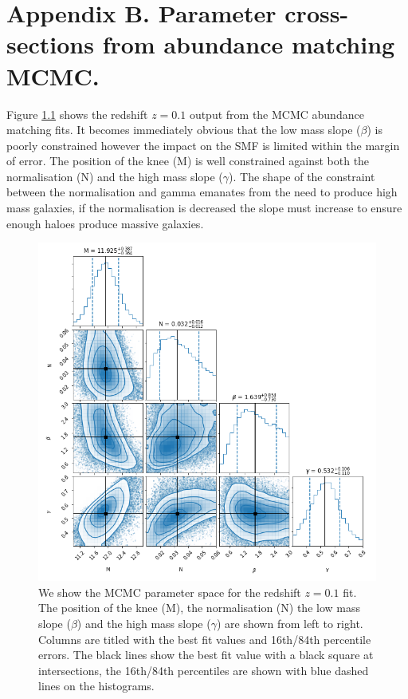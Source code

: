 \chapter{Appendix B. Parameter cross-sections from abundance matching MCMC.}

\label{Appx:AbnMCMC}

Figure \ref{fig:MCMC_lz} shows the redshift $z = 0.1$ output from the MCMC abundance matching fits. It becomes immediately obvious that the low mass slope ($\beta$) is poorly constrained however the impact on the SMF is limited within the margin of error. The position of the knee (M) is well constrained against both the normalisation (N) and the high mass slope ($\gamma$). The shape of the constraint between the normalisation and gamma emanates from the need to produce high mass galaxies, if the normalisation is decreased the slope must increase to ensure enough haloes produce massive galaxies.

\begin{figure}
	\centering
	\includegraphics[width = \linewidth]{Appendices/AbnMCMC/MCMC_plot_lz.png}
    \caption{We show the MCMC parameter space for the redshift $z = 0.1$ fit. The position of the knee (M), the normalisation (N) the low mass slope ($\beta$) and the high mass slope ($\gamma$) are shown from left to right. Columns are titled with the best fit values and 16th/84th percentile errors. The black lines show the best fit value with a black square at intersections, the 16th/84th percentiles are shown with blue dashed lines on the histograms.}
	\label{fig:MCMC_lz}
\end{figure}

